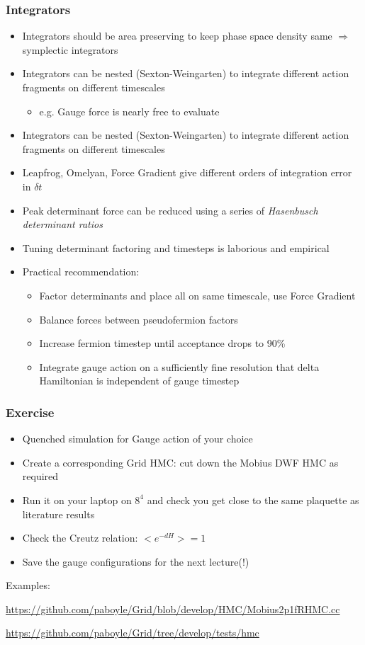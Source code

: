 \documentclass[pdf,ps,8pt]{beamer}
\newcommand{\link}[1]{\href{#1}{ {\color{blue} #1} }}
\begin{document}
\begin{frame}[fragile]\small\frametitle{ Integrators }
\begin{itemize}
\item Integrators should be area preserving to keep phase space density same $\Rightarrow$ symplectic integrators
\item Integrators can be nested (Sexton-Weingarten) to integrate different action fragments on different timescales
\begin{itemize}
\item e.g. Gauge force is nearly free to evaluate
\end{itemize}
\item Integrators can be nested (Sexton-Weingarten) to integrate different action fragments on different timescales
\item Leapfrog, Omelyan, Force Gradient give different orders of integration error in $\delta t$ 
\item Peak determinant force can be reduced using a series of \emph{Hasenbusch determinant ratios}
\item Tuning determinant factoring and timesteps is laborious and empirical
\item Practical recommendation: 
\begin{itemize}
\item Factor determinants and place all on same timescale, use Force Gradient
\item Balance forces between pseudofermion factors
\item Increase fermion timestep until acceptance drops to 90\%
\item Integrate gauge action on a sufficiently fine resolution that delta Hamiltonian is independent of gauge timestep
\end{itemize}
\end{itemize}
\end{frame}

\begin{frame}[fragile]\small\frametitle{Exercise}

\begin{itemize} 
\item Quenched simulation for Gauge action of your choice
\item Create a corresponding Grid HMC: cut down the Mobius DWF HMC as required
\item Run it on your laptop on $8^4$ and check you get close to the same plaquette as literature results
\item Check the Creutz relation: $<e^{-dH}> = 1$
\item Save the gauge configurations for the next lecture(!)
\end{itemize}

Examples:

\link{https://github.com/paboyle/Grid/blob/develop/HMC/Mobius2p1fRHMC.cc}

\link{https://github.com/paboyle/Grid/tree/develop/tests/hmc}

\end{frame}
\end{document}
